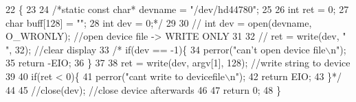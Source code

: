\begin{DoxyCode}
22               \{
23 
24 \textcolor{comment}{/*static const char* devname = "/dev/hd44780";}
25 \textcolor{comment}{}
26 \textcolor{comment}{int ret = 0;}
27 \textcolor{comment}{char buff[128] = "";}
28 \textcolor{comment}{int dev = 0;*/}
29     
30 \textcolor{comment}{//  int dev = open(devname, O\_WRONLY);  //open device file -> WRITE ONLY}
31     
32 \textcolor{comment}{//  ret = write(dev, "                                ", 32);   //clear display}
33 \textcolor{comment}{/*  if(dev == -1)\{}
34 \textcolor{comment}{        perror("can't open device file\(\backslash\)n");}
35 \textcolor{comment}{        return -EIO;}
36 \textcolor{comment}{    \}}
37 \textcolor{comment}{}
38 \textcolor{comment}{    ret = write(dev, argv[1], 128);     //write string to device}
39 \textcolor{comment}{}
40 \textcolor{comment}{    if(ret < 0)\{}
41 \textcolor{comment}{        perror("cant write to devicefile\(\backslash\)n");}
42 \textcolor{comment}{        return EIO;}
43 \textcolor{comment}{    \}*/}
44 
45 \textcolor{comment}{//close(dev);       //close device afterwards}
46 
47 \textcolor{keywordflow}{return} 0;
48 \}
\end{DoxyCode}
